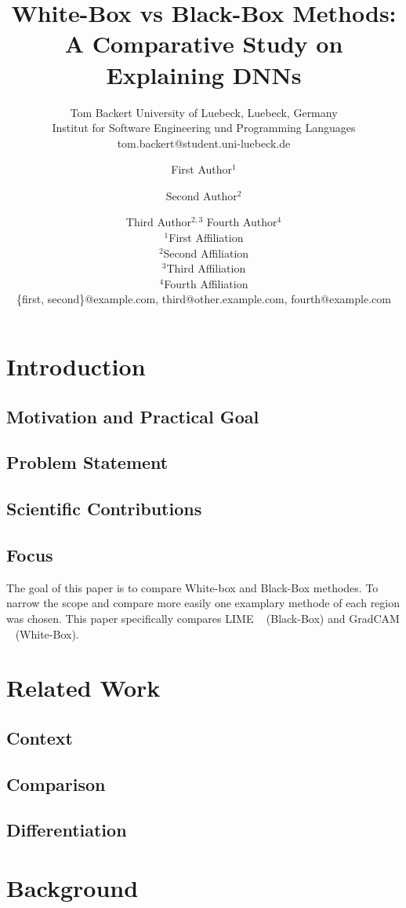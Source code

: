 \documentclass{article}
\title{White-Box vs Black-Box Methods: A Comparative Study on Explaining DNNs}
\author{
    Tom Backert
    \affiliations
    University of Luebeck, Luebeck, Germany\\
    Institut for Software Engineering und Programming Languages
    \emails
    tom.backert@student.uni-luebeck.de
}
\author{
First Author$^1$
\and
Second Author$^2$\and
Third Author$^{2,3}$\And
Fourth Author$^4$\\
\affiliations
$^1$First Affiliation\\
$^2$Second Affiliation\\
$^3$Third Affiliation\\
$^4$Fourth Affiliation\\
\emails
\{first, second\}@example.com,
third@other.example.com,
fourth@example.com
}
\begin{document}
\maketitle

\begin{abstract}
    
\end{abstract}

\section{Introduction}
\subsection{Motivation and Practical Goal}
\subsection{Problem Statement}
\subsection{Scientific Contributions}

\subsection{Focus}
The goal of this paper is to compare White-box and Black-Box methodes. To narrow the scope and compare more easily one examplary methode of each region was chosen. This paper specifically compares LIME ~\cite{ribeiro2016why} (Black-Box) and GradCAM ~\cite{Selvaraju_2019} (White-Box).


\section{Related Work}
\subsection{Context}
\subsection{Comparison}
\subsection{Differentiation}

\section{Background}
\end{document}
